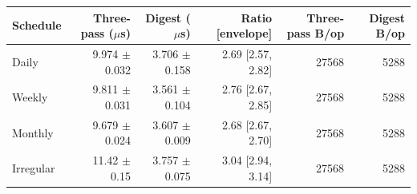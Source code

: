 \begin{tabular}{lrrrrr}
\toprule
Schedule & Three-pass ($\mu$s) & Digest ($\mu$s) & Ratio [envelope] & Three-pass B/op & Digest B/op \\
\midrule
Daily & 9.974 $\pm$ 0.032 & 3.706 $\pm$ 0.158 & 2.69 [2.57, 2.82] & 27568 & 5288 \\
Weekly & 9.811 $\pm$ 0.031 & 3.561 $\pm$ 0.104 & 2.76 [2.67, 2.85] & 27568 & 5288 \\
Monthly & 9.679 $\pm$ 0.024 & 3.607 $\pm$ 0.009 & 2.68 [2.67, 2.70] & 27568 & 5288 \\
Irregular & 11.42 $\pm$ 0.15 & 3.757 $\pm$ 0.075 & 3.04 [2.94, 3.14] & 27568 & 5288 \\
\bottomrule
\end{tabular}
